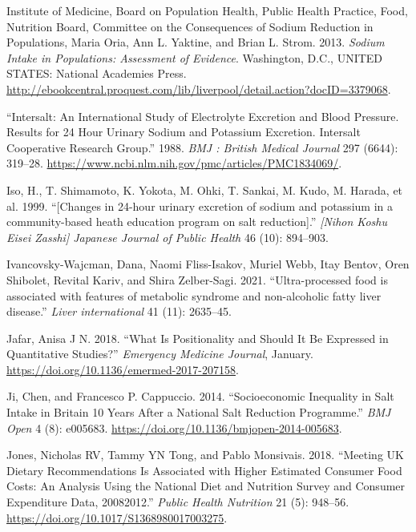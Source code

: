 \documentclass[
]{article}
\newlength{\cslhangindent}
\newlength{\cslentryspacingunit} %
\newenvironment{CSLReferences}[2] %
 {%
  \setlength{\parindent}{0pt}
  \ifodd #1
  \let\oldpar\par
  \def\par{\hangindent=\cslhangindent\oldpar}
  \fi
  \setlength{\parskip}{#2\cslentryspacingunit}
 }%
 {}
\begin{document}
\begin{CSLReferences}{1}{0}
\leavevmode{}%
Institute of Medicine, Board on Population Health, Public Health
Practice, Food, Nutrition Board, Committee on the Consequences of Sodium
Reduction in Populations, Maria Oria, Ann L. Yaktine, and Brian L.
Strom. 2013. \emph{Sodium Intake in Populations: Assessment of
Evidence}. Washington, D.C., UNITED STATES: National Academies Press.
\url{http://ebookcentral.proquest.com/lib/liverpool/detail.action?docID=3379068}.

\leavevmode{}%
{``Intersalt: An International Study of Electrolyte Excretion and Blood
Pressure. Results for 24 Hour Urinary Sodium and Potassium Excretion.
Intersalt Cooperative Research Group.''} 1988. \emph{BMJ : British
Medical Journal} 297 (6644): 319--28.
\url{https://www.ncbi.nlm.nih.gov/pmc/articles/PMC1834069/}.

\leavevmode{}%
Iso, H., T. Shimamoto, K. Yokota, M. Ohki, T. Sankai, M. Kudo, M.
Harada, et al. 1999. {``{[}Changes in 24-hour urinary excretion of
sodium and potassium in a community-based heath education program on
salt reduction{]}.''} \emph{{[}Nihon Koshu Eisei Zasshi{]} Japanese
Journal of Public Health} 46 (10): 894--903.

\leavevmode{}%
Ivancovsky-Wajcman, Dana, Naomi Fliss-Isakov, Muriel Webb, Itay Bentov,
Oren Shibolet, Revital Kariv, and Shira Zelber-Sagi. 2021.
{``Ultra{-}processed food is associated with features of metabolic
syndrome and non{-}alcoholic fatty liver disease.''} \emph{Liver
international} 41 (11): 2635--45.

\leavevmode{}%
Jafar, Anisa J N. 2018. {``What Is Positionality and Should It Be
Expressed in Quantitative Studies?''} \emph{Emergency Medicine Journal},
January. \url{https://doi.org/10.1136/emermed-2017-207158}.

\leavevmode{}%
Ji, Chen, and Francesco P. Cappuccio. 2014. {``Socioeconomic Inequality
in Salt Intake in Britain 10 Years After a National Salt Reduction
Programme.''} \emph{BMJ Open} 4 (8): e005683.
\url{https://doi.org/10.1136/bmjopen-2014-005683}.

\leavevmode{}%
Jones, Nicholas RV, Tammy YN Tong, and Pablo Monsivais. 2018. {``Meeting
UK Dietary Recommendations Is Associated with Higher Estimated Consumer
Food Costs: An Analysis Using the National Diet and Nutrition Survey and
Consumer Expenditure Data, 2008{\textendash}2012.''} \emph{Public Health
Nutrition} 21 (5): 948--56.
\url{https://doi.org/10.1017/S1368980017003275}.


\end{CSLReferences}
\end{document}
